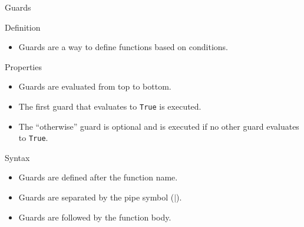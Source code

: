 \begin{frame}{Guards}
    \begin{block}{Definition}
        \begin{itemize}
            \item Guards are a way to define functions based on conditions.
        \end{itemize}
    \end{block}
    \begin{block}{Properties}
        \begin{itemize}
            \item Guards are evaluated from top to bottom.
            \item The first guard that evaluates to \texttt{True} is executed.
            \item The ``otherwise'' guard is optional and is executed if no other guard evaluates to \texttt{True}.
        \end{itemize}
    \end{block}
    \begin{block}{Syntax}
        \begin{itemize}
            \item Guards are defined after the function name.
            \item Guards are separated by the pipe symbol ($|$).
            \item Guards are followed by the function body.
        \end{itemize}
    \end{block}
\end{frame}